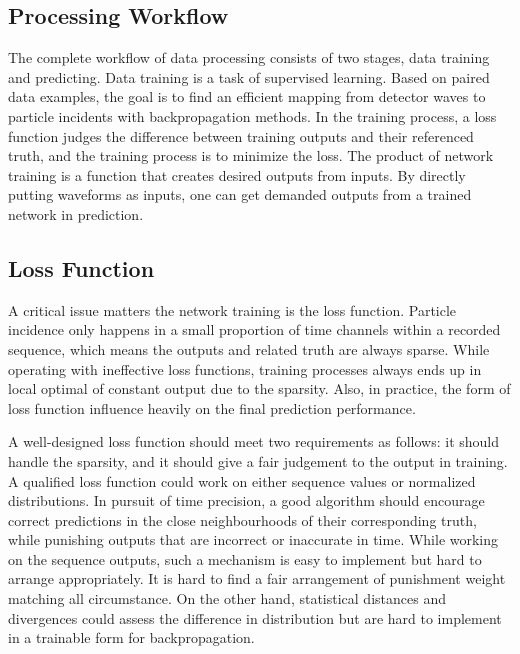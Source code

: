 \documentclass[12pt]{article}
\begin{document}
\subsection{Processing Workflow}
The complete workflow of data processing consists of two stages, data training and predicting. Data training is a task of supervised learning.  Based on paired data examples, the goal is to find an efficient mapping from detector waves to particle incidents with backpropagation methods. In the training process, a loss function judges the difference between training outputs and their referenced truth, and the training process is to minimize the loss. The product of network training is a function that creates desired outputs from inputs. By directly putting waveforms as inputs, one can get demanded outputs from a trained network in prediction.

\subsection{Loss Function}
A critical issue matters the network training is the loss function. Particle incidence only happens in a small proportion of time channels within a recorded sequence, which means the outputs and related truth are always sparse. While operating with ineffective loss functions, training processes always ends up in local optimal of constant output due to the sparsity. Also, in practice, the form of loss function influence heavily on the final prediction performance. 

A well-designed loss function should meet two requirements as follows: it should handle the sparsity, and it should give a fair judgement to the output in training. A qualified loss function could work on either sequence values or normalized distributions. In pursuit of time precision, a good algorithm should encourage correct predictions in the close neighbourhoods of their corresponding truth, while punishing outputs that are incorrect or inaccurate in time. While working on the sequence outputs, such a mechanism is easy to implement but hard to arrange appropriately. It is hard to find a fair arrangement of punishment weight matching all circumstance. On the other hand, statistical distances and divergences could assess the difference in distribution but are hard to implement in a trainable form for backpropagation. 
\end{document}

